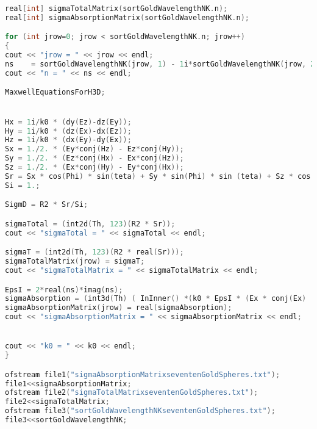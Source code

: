 \begin{lstlisting}[language=C]
real[int] sigmaTotalMatrix(sortGoldWavelengthNK.n);
real[int] sigmaAbsorptionMatrix(sortGoldWavelengthNK.n);

for (int jrow=0; jrow < sortGoldWavelengthNK.n; jrow++)
{
cout << "jrow = " << jrow << endl;
ns    = sortGoldWavelengthNK(jrow, 1) - 1i*sortGoldWavelengthNK(jrow, 2);
cout << "n = " << ns << endl;

MaxwellEquationsForH3D;


Hx = 1i/k0 * (dy(Ez)-dz(Ey));
Hy = 1i/k0 * (dz(Ex)-dx(Ez));
Hz = 1i/k0 * (dx(Ey)-dy(Ex));
Sx = 1./2. * (Ey*conj(Hz) - Ez*conj(Hy));
Sy = 1./2. * (Ez*conj(Hx) - Ex*conj(Hz));
Sz = 1./2. * (Ex*conj(Hy) - Ey*conj(Hx));
Sr = Sx * cos(Phi) * sin(teta) + Sy * sin(Phi) * sin (teta) + Sz * cos(teta);
Si = 1.;

SigmD = R2 * Sr/Si;

sigmaTotal = (int2d(Th, 123)(R2 * Sr));
cout << "sigmaTotal = " << sigmaTotal << endl;

sigmaT = (int2d(Th, 123)(R2 * real(Sr)));
sigmaTotalMatrix(jrow) = sigmaT;
cout << "sigmaTotalMatrix = " << sigmaTotalMatrix << endl;

EpsI = 2*real(ns)*imag(ns);
sigmaAbsorption = (int3d(Th) ( InInner() *(k0 * EpsI * (Ex * conj(Ex)  +   Ey * conj(Ey) +   Ez * conj(Ez)))));
sigmaAbsorptionMatrix(jrow) = real(sigmaAbsorption);
cout << "sigmaAbsorptionMatrix = " << sigmaAbsorptionMatrix << endl;		 


cout << "k0 = " << k0 << endl;
}

ofstream file1("sigmaAbsorptionMatrixseventenGoldSpheres.txt");
file1<<sigmaAbsorptionMatrix;
ofstream file2("sigmaTotalMatrixseventenGoldSpheres.txt");
file2<<sigmaTotalMatrix;
ofstream file3("sortGoldWavelengthNKseventenGoldSpheres.txt");
file3<<sortGoldWavelengthNK;
\end{lstlisting}